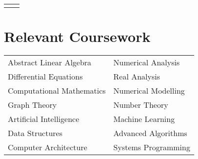 \documentclass[10pt, oneside, openany]{article} %
\begin{document}
\begin{paracol}{2}
\begin{supertabular}{ll}
	
	
\end{supertabular}


\section{Relevant Coursework}

\begin{tabular}{l l}
Abstract Linear Algebra & Numerical Analysis\\
Differential Equations & Real Analysis\\
Computational Mathematics & Numerical Modelling\\
Graph Theory & Number Theory\\
Artificial Intelligence & Machine Learning\\
Data Structures & Advanced Algorithms\\
Computer Architecture & Systems Programming\\
\end{tabular}





\vspace{-\baselineskip}\medskip %

\switchcolumn %



\end{paracol}
\end{document}
